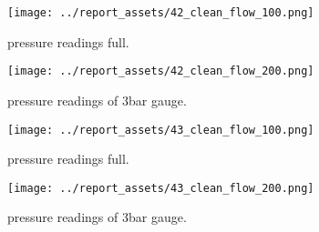 \begin{figure}[htbp]
    \centering
    
    \begin{minipage}{0.45\textwidth}
        \centering
        \texttt{[image: ../report\_assets/42\_clean\_flow\_100.png]}
        \caption{pressure readings full.}\label{fig:42_flow_100}
    \end{minipage}
    \hfill
    \begin{minipage}{0.45\textwidth}
        \centering
        \texttt{[image: ../report\_assets/42\_clean\_flow\_200.png]}
        \caption{pressure readings of 3bar gauge.}\label{fig:42_flow_200}
    \end{minipage}
    
\end{figure}

\begin{figure}[htbp]
    \centering

    \begin{minipage}{0.45\textwidth}
        \centering
        \texttt{[image: ../report\_assets/43\_clean\_flow\_100.png]}
        \caption{pressure readings full.}\label{fig:43_flow_100}
    \end{minipage}
    \hfill
    \begin{minipage}{0.45\textwidth}
        \centering
        \texttt{[image: ../report\_assets/43\_clean\_flow\_200.png]}
        \caption{pressure readings of 3bar gauge.}\label{fig:43_flow_200}
    \end{minipage}

\end{figure}